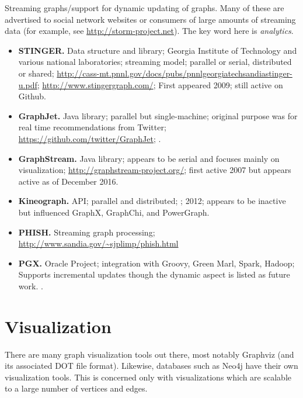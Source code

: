 \documentclass[11pt]{article}
\begin{document}
Streaming graphs/support for dynamic updating of graphs. Many of these are advertised to social network websites or consumers of large amounts of streaming data (for example, see \url{http://storm-project.net}). The key word here is \emph{analytics}.
\begin{itemize}
	\item \textbf{STINGER.} Data structure and library; Georgia Institute of Technology and various national laboratories; streaming model; parallel or serial, distributed or shared; \url{http://cass-mt.pnnl.gov/docs/pubs/pnnlgeorgiatechsandiastinger-u.pdf}; \url{http://www.stingergraph.com/}; First appeared 2009; still active on Github.

	\item \textbf{GraphJet.} Java library; parallel but single-machine; original purpose was for real time recommendations from Twitter; \url{https://github.com/twitter/GraphJet}; \cite{Sharma:2016:GraphJet}.

	\item \textbf{GraphStream.} Java library; appears to be serial and focuses mainly on visualization; \url{http://graphstream-project.org/}; \cite{Dutot:2007:GraphStream} first active 2007 but appears active as of December 2016.

	\item \textbf{Kineograph.} API; parallel and distributed; \cite{Cheng:2012:Kineograph}; 2012; appears to be inactive but influenced GraphX, GraphChi, and PowerGraph.
	
	\item \textbf{PHISH.} Streaming graph processing; \url{http://www.sandia.gov/~sjplimp/phish.html}
	
	\item \textbf{PGX.} Oracle Project; integration with Groovy, Green Marl, Spark, Hadoop; Supports incremental updates though the dynamic aspect is listed as future work. \cite{Hong:2015:PGX}.
\end{itemize}

\section{Visualization}
There are many graph visualization tools out there, most notably Graphviz (and its associated DOT file format). Likewise, databases such as Neo4j have their own visualization tools. This is concerned only with visualizations which are scalable to a large number of vertices and edges.
\end{document}
